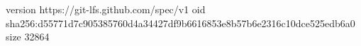 version https://git-lfs.github.com/spec/v1
oid sha256:d55771d7c905385760d4a34427df9b6616853e8b57b6e2316c10dce525edb6a0
size 32864
